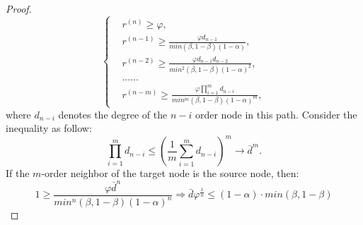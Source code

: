 \begin{proof}
\begin{equation}
    \begin{cases}
        & r^{(n)} \geq \varphi, \\
        & r^{(n-1)} \geq \frac{\varphi d_{n-1}}{min(\beta,1-\beta)(1-\alpha)}, \\
        & r^{(n-2)} \geq \frac{\varphi d_{n-1}d_{n-2}}{min^2(\beta,1-\beta)(1-\alpha)^2}, \\
        & ......\\
        & r^{(n-m)} \geq \frac{\varphi \prod\limits_{i=1}^{m}d_{n-i}}{min^m(\beta,1-\beta)(1-\alpha)^m},
    \end{cases}
\end{equation}
where $d_{n-i}$ denotes the degree of the $n-i$ order node in this path.
Consider the inequality as follow:
\begin{equation}
    \prod\limits_{i=1}^{m}d_{n-i} \leq (\frac{1}{m}\sum\limits_{i=1}^{m}d_{n-i})^m \rightarrow \bar{d}^m.
\end{equation}
If the $m$-order neighbor of the target node is the source node, then:
\begin{equation}
    1 \geq \frac{\varphi \bar{d}^n}{min^n(\beta,1-\beta)(1-\alpha)^n}
\Rightarrow \bar{d}\varphi^{\frac{1}{n}} \leq (1-\alpha) \cdot min(\beta,1-\beta)
\end{equation}
\end{proof}